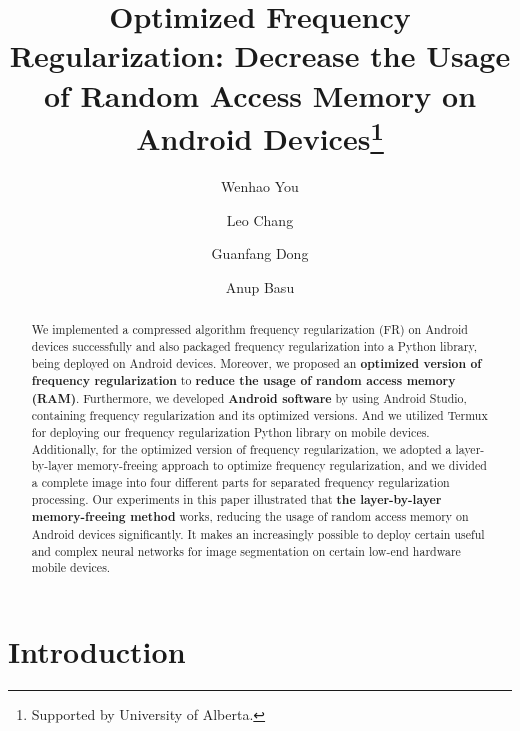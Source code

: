 \documentclass[runningheads]{llncs}
\begin{document}
%
\title{Optimized Frequency Regularization: Decrease the Usage of Random Access Memory on Android Devices\thanks{Supported by University of Alberta.}}
%
%
\author{Wenhao You \and
Leo Chang \and
Guanfang Dong \and
Anup Basu}
%
%
%
\maketitle              %
%
\begin{abstract}
We implemented a compressed algorithm frequency regularization (FR) on Android devices successfully and also packaged frequency regularization into a Python library, being deployed on Android devices. Moreover, we proposed an \textbf{optimized version of frequency regularization} to \textbf{reduce the usage of random access memory (RAM)}. Furthermore, we developed \textbf{Android software} by using Android Studio, containing frequency regularization and its optimized versions. And we utilized Termux for deploying our frequency regularization Python library on mobile devices. Additionally, for the optimized version of frequency regularization, we adopted a layer-by-layer memory-freeing approach to optimize frequency regularization, and we divided a complete image into four different parts for separated frequency regularization processing. Our experiments in this paper illustrated that \textbf{the layer-by-layer memory-freeing method} works, reducing the usage of random access memory on Android devices significantly. It makes an increasingly possible to deploy certain useful and complex neural networks for image segmentation on certain low-end hardware mobile devices.

\end{abstract}
%
%
%
\section{Introduction}
\end{document}
